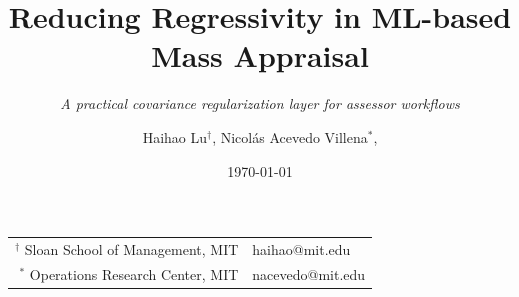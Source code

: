 \documentclass[aspectratio=169,10pt]{beamer}
\title[Soft Vertical Equity Constraints for ML]{\color{white} Reducing Regressivity in ML-based Mass Appraisal}
\subtitle{\color{white} \textit{A practical covariance regularization layer for assessor workflows}}
\author{Haihao Lu$^{\dagger}$, Nicol\'as Acevedo Villena$^*$, }
\date{\today}
\begin{document}


\begin{frame}
  \titlepage
  \vspace{-2mm}
  \begin{center}\footnotesize
  \begin{tabular}{r|l}
  $^\dagger$ Sloan School of Management,
MIT & haihao@mit.edu \\
  $^*$ Operations Research Center, MIT & nacevedo@mit.edu
  \end{tabular}
  \end{center}
\end{frame}

\end{document}
